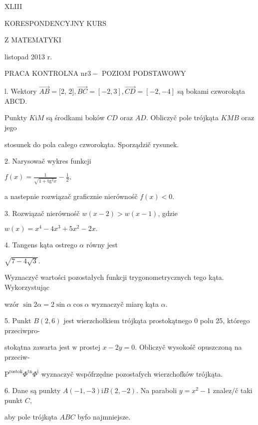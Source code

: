 \documentclass[a4paper,12pt]{article}
\begin{document}
XLIII

KORESPONDENCYJNY KURS

Z MATEMATYKI

listopad 2013 r.

PRACA KONTROLNA $\mathrm{n}\mathrm{r} 3-$ POZIOM PODSTAWOWY

l. Wektory $\vec{AB} = [2$, 2$], \vec{BC} = [-2,3], \vec{CD} = [-2,-4]$ są bokami czworokąta ABCD.

Punkty $K\mathrm{i}M$ są środkami boków $CD$ oraz $AD$. Obliczyč pole trójkąta $KMB$ oraz jego

stosunek do pola całego czworokąta. Sporządzič rysunek.

2. Narysowač wykres funkcji

$f(x)=\displaystyle \frac{1}{\sqrt{1+\mathrm{t}\mathrm{g}^{2}x}}-\frac{1}{2},$

a nastepnie rozwiązač graficznie nierównośč $f(x)<0.$

3. Rozwiązač nierównośč $w(x-2)>w(x-1)$, gdzie

$w(x)=x^{4}-4x^{3}+5x^{2}-2x.$

4. Tangens kąta ostrego $\alpha$ równy jest

$\sqrt{7-4\sqrt{3}}.$

Wyznaczyč wartości pozostałych funkcji trygonometrycznych tego kąta. Wykorzystując

wzór $\sin 2\alpha=2\sin\alpha\cos\alpha$ wyznaczyč miarę kąta $\alpha.$

5. Punkt $B(2,6)$ jest wierzchołkiem trójkąta prostokątnego $0$ polu 25, którego przeciwpro-

stokątna zawarta jest $\mathrm{w}$ prostej $x-2y=0$. Obliczyč wysokośč opuszczoną na przeciw-

$\mathrm{P}^{\mathrm{r}\mathrm{o}\mathrm{s}\mathrm{t}\mathrm{o}\mathrm{k}}\Phi^{\mathrm{t}\mathrm{n}}\Phi^{\mathrm{i}}$ wyznaczyč wspófrzędne pozostafych wierzchofków trójkąta.

6. Dane są punkty $A(-1,-3) \mathrm{i}B(2,-2)$. Na paraboli $y=x^{2}-1$ znalez/č taki punkt $C,$

aby pole trójkąta $ABC$ byfo najmniejsze.
\end{document}
